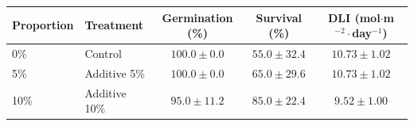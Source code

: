 \begin{tabular}{llccc}
\hline\hline
\textbf{Proportion} & \textbf{Treatment} & \textbf{Germination (\%)} & \textbf{Survival (\%)} & \textbf{DLI (mol$\cdot$m$^{-2}\cdot$day$^{-1}$)} \\
\hline
0\% & Control & $100.0 \pm 0.0$ & $55.0 \pm 32.4$ & $10.73 \pm 1.02$ \\
5\% & Additive 5\% & $100.0 \pm 0.0$ & $65.0 \pm 29.6$ & $10.73 \pm 1.02$ \\
10\% & Additive 10\% & $95.0 \pm 11.2$ & $85.0 \pm 22.4$ & $9.52 \pm 1.00$ \\
\hline
\end{tabular}
